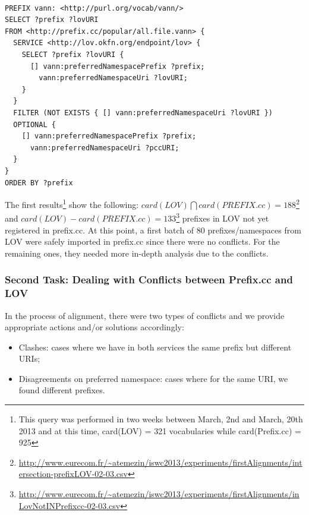 \begin{lstlisting}

PREFIX vann: <http://purl.org/vocab/vann/>
SELECT ?prefix ?lovURI
FROM <http://prefix.cc/popular/all.file.vann> {
  SERVICE <http://lov.okfn.org/endpoint/lov> {
    SELECT ?prefix ?lovURI {
      [] vann:preferredNamespacePrefix ?prefix;
        vann:preferredNamespaceUri ?lovURI;
    }
  }
  FILTER (NOT EXISTS { [] vann:preferredNamespaceUri ?lovURI })
  OPTIONAL {
    [] vann:preferredNamespacePrefix ?prefix;
      vann:preferredNamespaceUri ?pccURI;
  }
}
ORDER BY ?prefix
\end{lstlisting}
The first results\footnote{This query was performed in two weeks between March, 2nd and March, 20th 2013 and at this time, card(LOV) = 321 vocabularies while card(Prefix.cc) = 925} show the following: $card(LOV) \bigcap card(PREFIX.cc) = 188$\footnote{\url{http://www.eurecom.fr/~atemezin/iswc2013/experiments/firstAlignments/intersection-prefixLOV-02-03.csv}} and $card (LOV) - card( PREFIX.cc) = 133$\footnote{\url{http://www.eurecom.fr/~atemezin/iswc2013/experiments/firstAlignments/inLovNotINPrefixcc-02-03.csv}} prefixes in LOV not yet registered in prefix.cc. At this point, a first batch of $80$ prefixes/namespaces from LOV were safely imported in prefix.cc since there were no conflicts. For the remaining ones, they needed more in-depth analysis due to the conflicts.

\subsubsection{Second Task: Dealing with Conflicts between Prefix.cc and LOV}  \label{sec:conflicts}
In the process of alignment, there were two types of conflicts and we provide appropriate actions and/or solutions accordingly:
\begin{itemize}
 \item Clashes: cases where we have in both services the same prefix but different URIs;
 \item Disagreements on preferred namespace: cases where for the same URI, we found different prefixes.
\end{itemize}


